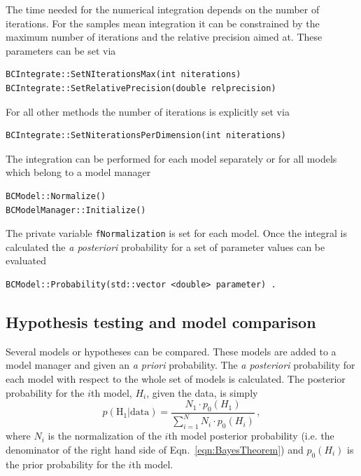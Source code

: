 \documentclass[11pt, a4paper]{article}
\begin{document}
\noindent 
The time needed for the numerical integration depends on the number of
iterations. For the samples mean integration it can be constrained by
the maximum number of iterations and the relative precision aimed
at. These parameters can be set via
%
\begin{verbatim}
BCIntegrate::SetNIterationsMax(int niterations)
BCIntegrate::SetRelativePrecision(double relprecision) 
\end{verbatim} 

\noindent 
For all other methods the number of iterations is explicitly set via 
%
\begin{verbatim}
BCIntegrate::SetNiterationsPerDimension(int niterations) 
\end{verbatim} 

\noindent 
The integration can be performed for each model separately or for all models which belong to a model manager 
%
\begin{verbatim}
BCModel::Normalize() 
BCModelManager::Initialize()
\end{verbatim} 

\noindent 
The private variable \verb|fNormalization| is set for each model. Once
the integral is calculated the {\it a posteriori} probability for a
set of parameter values can be evaluated

\begin{verbatim} 
BCModel::Probability(std::vector <double> parameter) .  
\end{verbatim} 


\subsection{Hypothesis testing and model comparison} 

Several models or hypotheses can be compared. These models are added
to a model manager and given an {\it a priori} probability. The {\it a
posteriori} probability for each model with respect to the whole set
of models is calculated. The posterior probability for the $i$th
model, $H_{i}$, given the data, is simply
%
\begin{equation}
p(\mathrm{H_{1}}|\mathrm{data}) = \frac{N_{1} \cdot p_{0}(H_{1})}{\sum_{i = 1}^{N} N_{i} \cdot p_{0}(H_{i})} \, , 
\end{equation}
%
where $N_{i}$ is the normalization of the $i$th model posterior
probability (i.e. the denominator of the right hand side of
Eqn.~\ref{eqn:BayesTheorem}) and $p_{0}(H_{i})$ is the prior
probability for the $i$th model. \\ 
\end{document}

